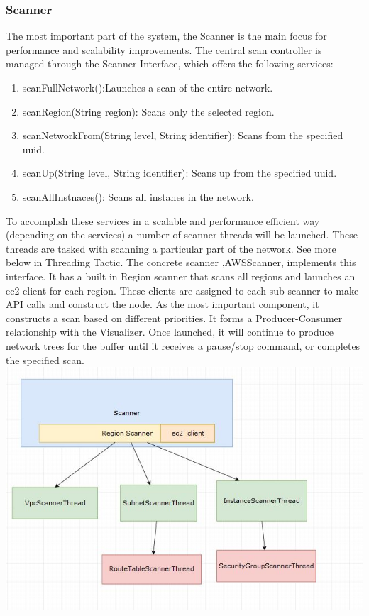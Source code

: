 \documentclass[hidelinks,a4paper,12pt]{article}
\begin{document}
\subsubsection{Scanner}
The most important part of the system, the Scanner is the main focus for performance and scalability improvements. The central scan controller is managed through the Scanner Interface, which offers the following services:
\begin{enumerate} 
\item scanFullNetwork():Launches a scan of the entire network.
\item scanRegion(String region): Scans only the selected region.
\item scanNetworkFrom(String level, String identifier): Scans from the specified uuid.
\item scanUp(String level, String identifier): Scans up from the specified uuid.
\item scanAllInstnaces(): Scans all instanes in the network.

\end{enumerate}

To accomplish these services in a scalable and performance efficient way (depending on the services) a number of scanner threads will be launched. These threads are tasked with scanning a particular part of the network. See more below in Threading Tactic.
\newline
The concrete scanner ,AWSScanner, implements this interface. It has a built in Region scanner that scans all regions and launches an ec2 client for each region. These clients are assigned to each sub-scanner to make API calls and construct the node.
\newline
As the most important component, it constructs a scan based on different priorities. It forms a Producer-Consumer relationship with the Visualizer. Once launched, it will continue to produce network trees for the buffer until it receives a pause/stop command, or completes the specified scan.
\newline
\includegraphics[width=1.00\textwidth]{./images/scanner.jpg}\\[0.4cm] 
\end{document}
